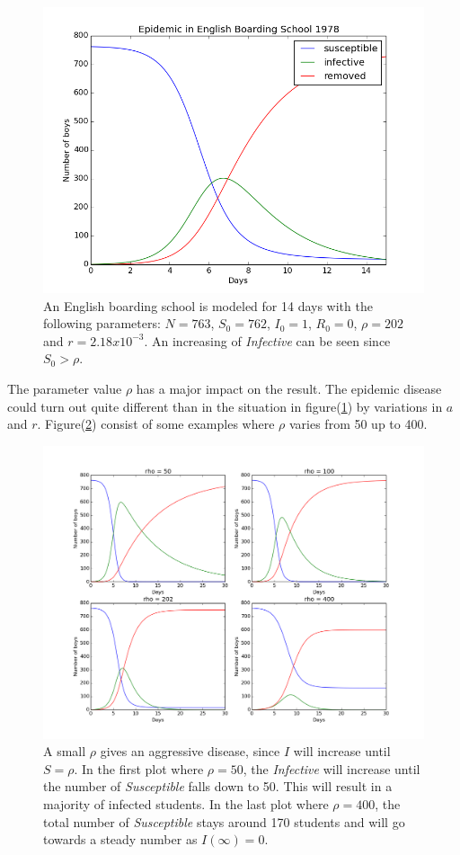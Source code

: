 \documentclass[%
twoside,                 %
final,                   %
10pt]{article}
\begin{document}
\begin{figure}[ht]
  \centerline{\includegraphics[width=0.9\linewidth]{plots/English_boarding_school.png}}
  \caption{
  \label{fig:english_boarding} An English boarding school is modeled for 14 days with the following parameters: $N=763$, $S_0=762$, $I_0=1$, $R_0=0$, $\rho=202$ and $r=2.18 x 10^{-3}$. An increasing of \emph{Infective} can be seen since $S_0 > \rho$.
  }
\end{figure}


The parameter value $\rho$ has a major impact on the result. The epidemic disease could turn out quite different than in the situation in figure(\ref{fig:english_boarding}) by variations in $a$ and $r$. Figure(\ref{fig:rho_changes}) consist of some examples where $\rho$ varies from 50 up to 400.


\begin{figure}[ht]
  \centerline{\includegraphics[width=0.9\linewidth]{plots/English_boarding_school_changes.png}}
  \caption{
  \label{fig:rho_changes} A small $\rho$ gives an aggressive disease, since $I$ will increase until $S= \rho$. In the first plot where $\rho=50$, the \emph{Infective} will increase until the number of \emph{Susceptible} falls down to 50. This will result in a majority of infected students. In the last plot where $\rho=400$, the total number of \emph{Susceptible} stays around 170 students and will go towards a steady number as $I(\infty)=0$.
  }
\end{figure}
\end{document}
